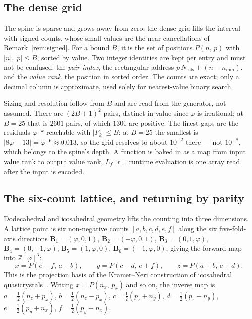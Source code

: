 \documentclass[11pt]{article}
\theoremstyle{definition}
\theoremstyle{remark}
\newcommand{\Zphi}{\mathbb{Z}[\varphi]}
\newcommand{\Pb}[2]{P(#1,\,#2)}
\begin{document}
\subsection{The dense grid}
\label{ss:grid}

The spine is sparse and grows away from zero; the dense grid fills the interval
with signed counts, whose small values are the near-cancellations of
Remark~\ref{rem:signed}. For a bound $B$, it is the set of positions $\Pb{n}{p}$
with $|n|,|p|\le B$, sorted by value. Two integer identities are kept per entry
and must not be confused: the \emph{pair index}, the rectangular address
$p\,N_{\text{cols}}+(n-n_{\min})$, and the \emph{value rank}, the position in
sorted order. The counts are exact; only a decimal column is approximate, used
solely for nearest-value binary search.

Sizing and resolution follow from $B$ and are read from the generator, not
assumed. There are $(2B+1)^2$ pairs, distinct in value since $\varphi$ is
irrational; at $B=25$ that is $2601$ pairs, of which $1300$ are positive. The
finest gaps are the residuals $\varphi^{-k}$ reachable with $|F_k|\le B$: at
$B=25$ the smallest is $|8\varphi-13|=\varphi^{-6}\approx0.013$, so the grid
resolves to about $10^{-2}$ there --- not $10^{-8}$, which belongs to the
spine's depth. A function is baked in as a map from input value rank to output
value rank, $L_f[r]$; runtime evaluation is one array read after the input is
encoded.

\subsection{The six-count lattice, and returning by parity}
\label{ss:lattice}

Dodecahedral and icosahedral geometry lifts the counting into three dimensions.
A lattice point is six non-negative counts $[a,b,c,d,e,f]$ along the six
five-fold-axis directions $\mathbf B_1=(\varphi,0,1)$, $\mathbf B_2=(-\varphi,0,1)$,
$\mathbf B_3=(0,1,\varphi)$, $\mathbf B_4=(0,-1,\varphi)$, $\mathbf B_5=(1,\varphi,0)$,
$\mathbf B_6=(-1,\varphi,0)$, giving the forward map into $\Zphi^3$:
\[
  x=\Pb{e-f}{a-b},\qquad y=\Pb{c-d}{e+f},\qquad z=\Pb{a+b}{c+d}.
\]
This is the projection basis of the Kramer--Neri construction of icosahedral
quasicrystals~\cite{kramer}. Writing $x=\Pb{n_x}{p_x}$ and so on, the inverse map
is $a=\tfrac12(n_z+p_x)$, $b=\tfrac12(n_z-p_x)$, $c=\tfrac12(p_z+n_y)$,
$d=\tfrac12(p_z-n_y)$, $e=\tfrac12(p_y+n_x)$, $f=\tfrac12(p_y-n_x)$.
\end{document}
